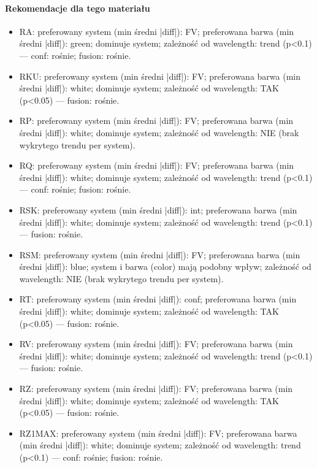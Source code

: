 \documentclass[
  10pt,
]{article}
\begin{document}
\paragraph{Rekomendacje dla tego materiału}
\begin{itemize}
\item RA: preferowany system (min średni |diff|): FV; preferowana barwa (min średni |diff|): green; dominuje system; zależność od wavelength: trend (p<0.1) — conf: rośnie; fusion: rośnie.
\item RKU: preferowany system (min średni |diff|): FV; preferowana barwa (min średni |diff|): white; dominuje system; zależność od wavelength: TAK (p<0.05) — fusion: rośnie.
\item RP: preferowany system (min średni |diff|): FV; preferowana barwa (min średni |diff|): white; dominuje system; zależność od wavelength: NIE (brak wykrytego trendu per system).
\item RQ: preferowany system (min średni |diff|): FV; preferowana barwa (min średni |diff|): white; dominuje system; zależność od wavelength: trend (p<0.1) — conf: rośnie; fusion: rośnie.
\item RSK: preferowany system (min średni |diff|): int; preferowana barwa (min średni |diff|): white; dominuje system; zależność od wavelength: trend (p<0.1) — fusion: rośnie.
\item RSM: preferowany system (min średni |diff|): FV; preferowana barwa (min średni |diff|): blue; system i barwa (color) mają podobny wpływ; zależność od wavelength: NIE (brak wykrytego trendu per system).
\item RT: preferowany system (min średni |diff|): conf; preferowana barwa (min średni |diff|): white; dominuje system; zależność od wavelength: TAK (p<0.05) — fusion: rośnie.
\item RV: preferowany system (min średni |diff|): FV; preferowana barwa (min średni |diff|): white; dominuje system; zależność od wavelength: trend (p<0.1) — fusion: rośnie.
\item RZ: preferowany system (min średni |diff|): FV; preferowana barwa (min średni |diff|): white; dominuje system; zależność od wavelength: TAK (p<0.05) — fusion: rośnie.
\item RZ1MAX: preferowany system (min średni |diff|): FV; preferowana barwa (min średni |diff|): white; dominuje system; zależność od wavelength: trend (p<0.1) — conf: rośnie; fusion: rośnie.
\end{itemize}
\end{document}
